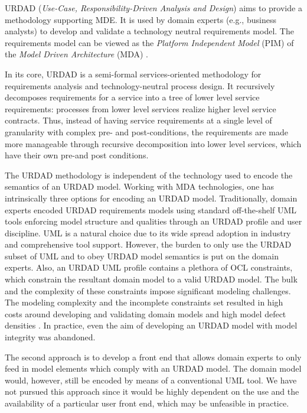 URDAD ({\em Use-Case, Responsibility-Driven Analysis and Design}) \cite{solms_technology_2007} aims to provide a methodology supporting MDE. It is used by domain experts (e.g., business analysts) to develop and validate a technology neutral requirements model. The requirements model can be viewed as the {\em Platform Independent Model} (PIM) of the {\em Model Driven Architecture} (MDA) \cite{solms_urdad_2010}.

In its core, URDAD is a semi-formal services-oriented methodology for requirements analysis and technology-neutral process design. It recursively decomposes requirements for a service into a tree of lower level service requirements: processes from lower level services realize higher level service contracts. Thus, instead of having service requirements at a single level of granularity with complex pre- and post-conditions, the requirements are made more manageable through recursive decomposition into lower level services, which have their own pre-and post conditions. 

The URDAD methodology is independent of the technology used to encode the semantics of an URDAD model. Working with MDA technologies, one has intrinsically three options for encoding an URDAD model. Traditionally, domain experts encoded URDAD requirements models using standard off-the-shelf UML tools enforcing model structure and qualities through an URDAD profile and user discipline. UML is a natural choice due to its wide spread adoption in industry and comprehensive tool support. However, the burden to only use the URDAD subset of UML and to obey URDAD model semantics is put on the domain experts. Also, an URDAD UML profile contains a plethora of OCL constraints, which constrain the resultant domain model to a valid URDAD model. The bulk and the complexity of these constraints impose significant modeling challenges. The modeling complexity and the incomplete constraints set resulted in high costs around developing and validating domain models and high model defect densities \cite{}. In practice, even the aim of developing an URDAD model with model integrity was abandoned.

The second approach is to develop a front end that allows domain experts to only feed in model elements which comply with an URDAD model. The domain model would, however, still be encoded by means of a conventional UML tool. We have not pursued this approach since it would be highly dependent on the use and the availability of a particular user front end, which may be unfeasible in practice.

